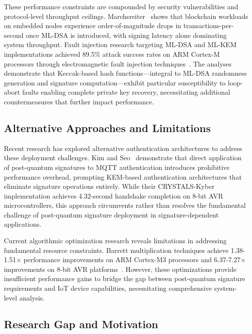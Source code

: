 \documentclass[journal=tches,final]{iacrtrans}
\begin{document}
{\color{blue}These performance constraints are compounded by security vulnerabilities and protocol-level throughput ceilings. Marchsreiter~\cite{Marchsreiter2024} shows that blockchain workloads on embedded nodes experience order-of-magnitude drops in transactions-per-second once ML-DSA is introduced, with signing latency alone dominating system throughput.} Fault injection research targeting ML-DSA and ML-KEM implementations achieved 89.5\% attack success rates on ARM Cortex-M processors through electromagnetic fault injection techniques~\cite{Li2024}. The analyses demonstrate that Keccak-based hash functions—integral to ML-DSA randomness generation and signature computation—exhibit particular susceptibility to loop-abort faults enabling complete private key recovery, necessitating additional countermeasures that further impact performance.

\subsection{Alternative Approaches and Limitations}

Recent research has explored alternative authentication architectures to address these deployment challenges. Kim and Seo~\cite{Kim2025} demonstrate that direct application of post-quantum signatures to MQTT authentication introduces prohibitive performance overhead, prompting KEM-based authentication architectures that eliminate signature operations entirely. While their CRYSTALS-Kyber implementation achieves 4.32-second handshake completion on 8-bit AVR microcontrollers, {\color{blue}this approach circumvents rather than resolves the fundamental challenge of post-quantum signature deployment in signature-dependent applications.}

Current algorithmic optimization research reveals limitations in addressing fundamental resource constraints. Barrett multiplication techniques achieve 1.38-1.51× performance improvements on ARM Cortex-M3 processors and 6.37-7.27× improvements on 8-bit AVR platforms~\cite{Barrett2023}. However, these optimizations provide insufficient performance gains to bridge the gap between post-quantum signature requirements and IoT device capabilities, necessitating comprehensive system-level analysis.

\subsection{Research Gap and Motivation}
\end{document}
